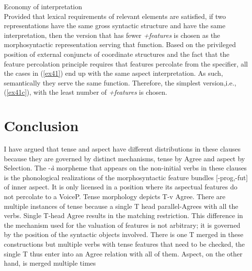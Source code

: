 \documentclass[output=paper,colorlinks,citecolor=brown]{langscibook}
\begin{document}
\ea
Economy of interpretation\\
Provided that lexical requirements of relevant elements are satisfied, if two representations have the same gross syntactic structure and have the same interpretation, then the version that has fewer \emph{+features} is chosen as the morphosyntactic representation serving that function.
\ex \label{ex41}
\z
\z
Based on the privileged position of external conjuncts of coordinate structures and the fact that the feature percolation principle requires that features percolate from the specifier, all the cases in (\ref{ex41}) end up with the same aspect interpretation. As such, semantically they serve the same function. Therefore, the simplest version,i.e., (\ref{ex41c}), with the least number of \emph{+features} is chosen. 


\section{Conclusion}
I have argued that tense and aspect have different distributions in these clauses because they are governed by distinct mechanisms, tense by Agree and aspect by Selection. The -\emph{\`a} morpheme that appears on the non-initial verbs in these clauses is the phonological realizations of the morphosyntactic feature bundles [-prog,-fut] of inner aspect. It is only licensed in a position where its aspectual features do not percolate to a VoiceP. Tense morphology depicts T-v Agree. There are multiple instances of tense because a single T head parallel-Agrees with all the verbs. Single T-head Agree results in the matching restriction. This difference in the mechanism used for the valuation of features is not arbitrary; it is governed by the position of the syntactic objects involved. There is one T merged in these constructions but multiple verbs with tense features that need to be checked, the single T thus enter into an Agree relation with all of them.  Aspect, on the other hand,  is merged multiple times 



\end{document}
